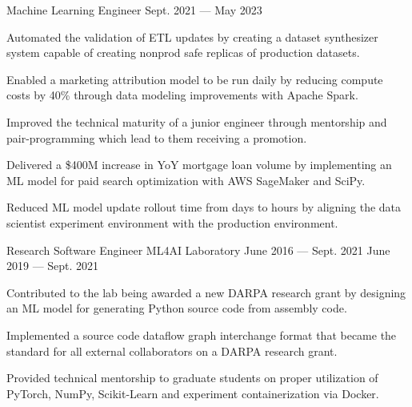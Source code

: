 \begin{cventries}
  \cventry
    {Machine Learning Engineer} %
    {} %
    {} %
    {Sept. 2021 --- May 2023} %
    {
      \vspace{-0.1cm}
      \begin{cvitems} %
        \item Automated the validation of ETL updates by creating a dataset synthesizer system capable of creating nonprod safe replicas of production datasets.
        \item Enabled a marketing attribution model to be run daily by reducing compute costs by 40\% through data modeling improvements with Apache Spark.
        \item Improved the technical maturity of a junior engineer through mentorship and pair-programming which lead to them receiving a promotion.
        \item Delivered a \$400M increase in YoY mortgage loan volume by implementing an ML model for paid search optimization with AWS SageMaker and SciPy.
        \item Reduced ML model update rollout time from days to hours by aligning the data scientist experiment environment with the production environment.
      \end{cvitems}
    }
  \vspace{.2cm}
  \cventry
    {Research Software Engineer} %
    {ML4AI Laboratory} %
    {June 2016 --- Sept. 2021} %
    {June 2019 --- Sept. 2021} %
    {
      \vspace{-0.1cm}
      \begin{cvitems} %
        \item Contributed to the lab being awarded a new DARPA research grant by designing an ML model for generating Python source code from assembly code.
        \item Implemented a source code dataflow graph interchange format that became the standard for all external collaborators on a DARPA research grant.
        \item Provided technical mentorship to graduate students on proper utilization of PyTorch, NumPy, Scikit-Learn and experiment containerization via Docker.
      \end{cvitems}
    }
    \vspace{.07cm}

\end{cventries}
